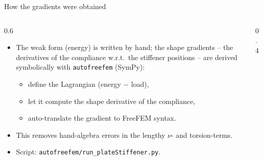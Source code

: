 \documentclass[10pt,c,intlimits,aspectratio=1610]{beamer}
\newcommand{\highlight}[1]{{\color{dpRed}#1}}
\begin{document}
\begin{frame}{How the gradients were obtained}
  \begin{columns}[c]
    \begin{column}{0.6\textwidth}
      \begin{itemize}
        \item The weak form (energy) is written by hand; the
              \highlight{shape gradients} -- the derivatives of the
              compliance w.r.t.\ the stiffener positions -- are derived
              \highlight{symbolically} with \texttt{autofreefem} (SymPy):
              \begin{itemize}
                \item define the Lagrangian (energy $-$ load),
                \item let it compute the \highlight{shape derivative}
                      of the compliance,
                \item auto-translate the gradient to FreeFEM syntax.
              \end{itemize}
        \item This removes hand-algebra errors in the lengthy
              $\nu$- and torsion-terms.
        \item Script: \texttt{autofreefem/run\_plateStiffener.py}.
      \end{itemize}
    \end{column}
    \begin{column}{0.4\textwidth}
      \centering
    \end{column}
  \end{columns}
\end{frame}
\end{document}
